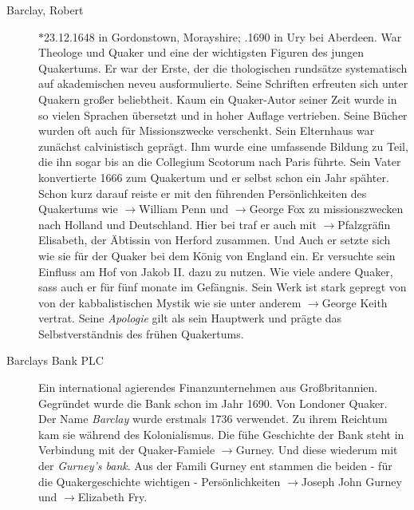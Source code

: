 \begin{description}
 \item[Barclay, Robert] $\ast$23.12.1648 in Gordonstown, Morayshire; .1690 in Ury bei Aberdeen. War Theologe und Quaker und eine der wichtigsten Figuren des jungen Quakertums. Er war der Erste, der die thologischen rundsätze systematisch auf akademischen neveu ausformulierte. Seine Schriften erfreuten sich unter Quakern großer beliebtheit. Kaum ein Quaker-Autor seiner Zeit wurde in so vielen Sprachen übersetzt und in hoher Auflage vertrieben. Seine Bücher wurden oft auch für Missionszwecke verschenkt. Sein Elternhaus war zunächst calvinistisch geprägt. Ihm wurde eine umfassende Bildung zu Teil, die ihn sogar bis an die Collegium Scotorum nach Paris führte. Sein Vater konvertierte 1666 zum Quakertum und er selbst schon ein Jahr spähter. Schon kurz darauf reiste er mit den führenden Persönlichkeiten des Quakertums wie $\to$William Penn und $\to$George Fox zu missionszwecken nach Holland und Deutschland. Hier bei traf er auch mit $\to$Pfalzgräfin Elisabeth, der Äbtissin von Herford zusammen. Und Auch er setzte sich wie sie für der Quaker bei dem König von England ein. Er versuchte sein Einfluss am Hof von Jakob II. dazu zu nutzen. Wie viele andere Quaker, sass auch er für fünf monate im Gefängnis. Sein Werk ist stark gepregt von von der kabbalistischen Mystik wie sie unter anderem $\to$George Keith vertrat. Seine \textit{Apologie} gilt als sein Hauptwerk und prägte das Selbstverständnis des frühen Quakertums.  

 \item[Barclays Bank PLC] Ein international agierendes Finanzunternehmen aus Großbritannien. Gegründet wurde die Bank schon im Jahr 1690. Von Londoner Quaker. Der Name \textit{Barclay} wurde erstmals 1736 verwendet. Zu ihrem Reichtum kam sie während des Kolonialismus. Die fühe Geschichte der Bank steht in Verbindung mit der Quaker-Famiele $\to$Gurney. Und diese wiederum mit der \textit{Gurney's bank}. Aus der Famili  Gurney ent stammen die beiden - für die Quakergeschichte wichtigen - Persönlichkeiten $\to$Joseph John Gurney und $\to$Elizabeth Fry.  


\end{description}
